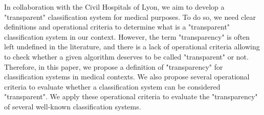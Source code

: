
  In collaboration with the Civil Hospitals of Lyon, we aim
to develop a "transparent" classification system for medical purposes.
To do so, we need clear definitions and operational criteria to determine
what is a "transparent" classification system in our context.
However, the term "transparency" is often left undefined
in the literature, and there is a lack of operational criteria
allowing to check whether a given algorithm deserves to be called
"transparent" or not.
Therefore, in this paper, we propose a definition of "transparency"
for classification systems in medical contexts.
We also propose several operational criteria to evaluate
whether a classification system can be considered 
"transparent".
We apply these operational criteria to evaluate the 
"transparency" of several well-known classification systems.


